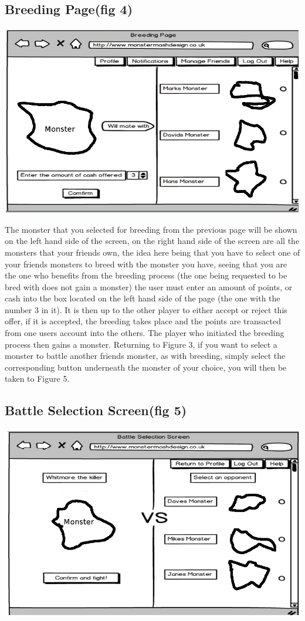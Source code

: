 \documentclass{project}
\begin{document}
\subsection{Breeding Page(fig 4)}
\includegraphics[scale=0.5]{breedingPage.jpg}

The monster that you selected for breeding from the previous page will be shown
on the left hand side of the screen, on the right hand side of the screen are all the
monsters that your friends own, the idea here being that you have to select one of
your friends monsters to breed with the monster you have, seeing that you are the
one who benefits from the breeding process (the one being requested to be bred with
does not gain a monster) the user must enter an amount of points, or cash into the
box located on the left hand side of the page (the one with the number 3 in it). It
is then up to the other player to either accept or reject this offer, if it is accepted,
the breeding takes place and the points are transacted from one users account into
the others. The player who initiated the breeding process then gains a monster.
Returning to Figure 3, if you want to select a monster to battle another friends
monster, as with breeding, simply select the corresponding button underneath the
monster of your choice, you will then be taken to Figure 5.
\newpage

\subsection{Battle Selection Screen(fig 5)}
\includegraphics[scale=0.5]{battleSelection.jpg}
\end{document}
